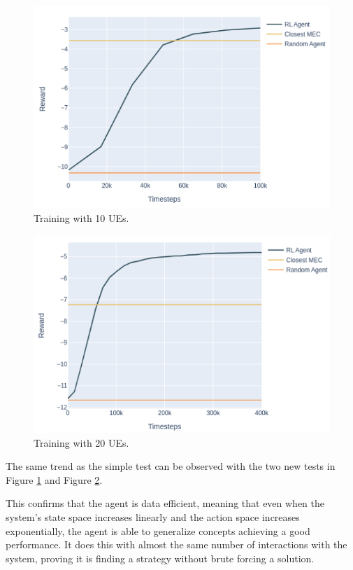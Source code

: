 \documentclass[conference]{IEEEtran}
\begin{document}
\begin{figure}[H]
  \centering
  \includegraphics[width=\linewidth]{images/5_10_training.png}
  \caption{Training with 10 \acrshort{UE}s.}  \label{5_10_training}
\end{figure}
\begin{figure}[H]
  \centering
  \includegraphics[width=\linewidth]{images/5_20_training.png}
  \caption{Training with 20 \acrshort{UE}s.}  \label{5_20_training}
\end{figure}

The same trend as the simple test can be observed with the two new tests in Figure \ref{5_10_training} and Figure \ref{5_20_training}.

This confirms that the agent is data efficient, meaning that even when the system's state space increases linearly and the action space increases exponentially, the agent is able to generalize concepts achieving a good performance. It does this with almost the same number of interactions with the system, proving it is finding a strategy without brute forcing a solution.
\end{document}
